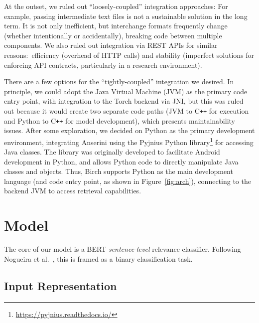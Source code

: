 At the outset, we ruled out ``loosely-coupled'' integration approaches:
For example, passing intermediate text files is not a sustainable solution in the long term.
It is not only inefficient, but interchange formats frequently change (whether intentionally or accidentally), breaking code between multiple components.
We also ruled out integration via REST APIs for similar reasons:\ efficiency (overhead of HTTP calls) and stability (imperfect solutions for enforcing API contracts, particularly in a research environment).

There are a few options for the ``tightly-coupled'' integration we desired.
In principle, we could adopt the Java Virtual Machine (JVM) as the primary code entry point, with integration to the Torch backend via JNI, but this was ruled out because it would create two separate code paths (JVM to C\texttt{++} for execution and Python to C\texttt{++} for model development), which presents maintainability issues.
After some exploration, we decided on Python as the primary development environment, integrating Anserini using the Pyjnius Python library\footnote{\url{https://pyjnius.readthedocs.io/}} for accessing Java classes.
The library was originally developed to facilitate Android development in Python, and allows Python code to directly manipulate Java classes and objects.
Thus, Birch supports Python as the main development language (and code entry point, as shown in Figure~\ref{fig:arch}), connecting to the backend JVM to access retrieval capabilities.

\section{Model}





The core of our model is a BERT {\it sentence-level} relevance classifier.
Following Nogueira et al.~\cite{nogueira2019passage}, this is framed as a binary classification task.

\subsection{Input Representation}

